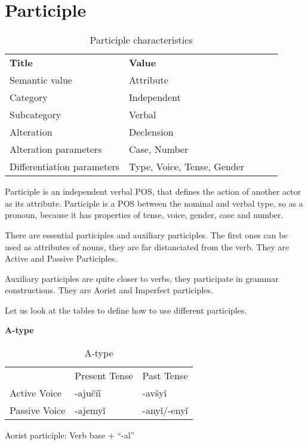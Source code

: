 \section{Participle}

\begin{table}[h]
	\caption{Participle characteristics}
	\begin{tabular}{lllll}
		\textbf{Title}              & \textbf{Value}               \\
		Semantic value              & Attribute                    \\
		Category                    & Independent                  \\
		Subcategory                 & Verbal                       \\
		Alteration                  & Declension                   \\
		Alteration parameters       & Case, Number                 \\
		Differentiation parameters  & Type, Voice, Tense, Gender
	\end{tabular}
\end{table}

Participle is an independent verbal POS, that defines the action of another actor as its attribute. Participle is a POS between the nominal and verbal type, so as a pronoun, because it has properties of tense, voice, gender, case and number.

There are essential participles and auxiliary participles. The first ones can be used as attributes of nouns, they are far distanciated from the verb. They are Active and Passive Participles.

Auxiliary participles are quite closer to verbs, they participate in grammar constructions. They are Aorist and Imperfect participles.

Let us look at the tables to define how to use different participles.

\textbf{A-type}

\begin{table}[!htb]
	\caption{A-type}
	\begin{tabular}{lll}
		& Present Tense & Past Tense \\
		 Active Voice & -ajučïǐ & -avšyǐ \\
		 Passive Voice & -ajemyǐ & -anyǐ/-enyǐ
	\end{tabular}
\end{table}

Aorist participle: Verb base + “-al”

